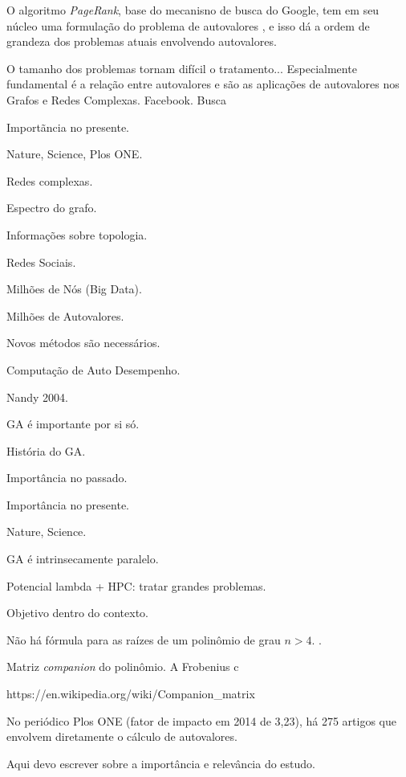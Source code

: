 	O algoritmo \emph{PageRank}, base do mecanisno de busca do Google, tem em seu núcleo uma formulação do problema de autovalores \cite{BrinPage98}, e isso dá a ordem de grandeza dos problemas atuais envolvendo autovalores.
	
	
	O tamanho dos problemas tornam difícil o tratamento... Especialmente fundamental é a relação entre autovalores e  são as aplicações de autovalores nos Grafos e Redes Complexas. Facebook. Busca

Importãncia no presente.

	
	 
	
Nature, Science, Plos ONE.

Redes complexas.

Espectro do grafo.

Informações sobre topologia.

Redes Sociais.

Milhões de Nós (Big Data).

Milhões de Autovalores.

Novos métodos são necessários.

Computação de Auto Desempenho.

Nandy 2004.

GA é importante por si só.

História do GA.

Importância no passado.

Importância no presente.

Nature, Science.

GA é intrinsecamente paralelo.

Potencial lambda + HPC: tratar grandes problemas.

Objetivo dentro do contexto.


Não há fórmula para as raízes de um polinômio de grau $n > 4$. \cite{Pan97}.

Matriz \emph{companion} do polinômio. A Frobenius c

https://en.wikipedia.org/wiki/Companion\_matrix

No periódico Plos ONE (fator de impacto em 2014 de 3,23), há 275 artigos que envolvem diretamente o cálculo de autovalores. 

Aqui devo escrever sobre a importância e relevância do estudo. 
